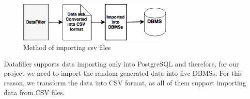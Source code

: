  \begin{figure} 
      \centering
      \includegraphics[width=\textwidth,height=2cm]{Images/4-Datafiller}
      \caption{Method of importing csv files}
      \label{fig:counting-methods}
  \end{figure}  


Datafiller supports data importing only into PostgreSQL and therefore, for our project we need to import the random generated data into five DBMSs. For this reason, we transform the data into CSV format, as all of them support importing data from CSV files.  

